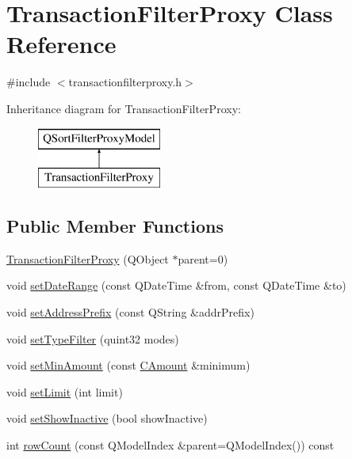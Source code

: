 \hypertarget{class_transaction_filter_proxy}{}\section{Transaction\+Filter\+Proxy Class Reference}
\label{class_transaction_filter_proxy}


{\ttfamily \#include $<$transactionfilterproxy.\+h$>$}

Inheritance diagram for Transaction\+Filter\+Proxy\+:\begin{figure}[H]
\begin{center}
\leavevmode
\includegraphics[height=2.000000cm]{class_transaction_filter_proxy}
\end{center}
\end{figure}
\subsection*{Public Member Functions}
\begin{DoxyCompactItemize}
\item 
\hyperlink{class_transaction_filter_proxy_a9981e03a2b60931e3e5adbe7e3fb6b7d}{Transaction\+Filter\+Proxy} (Q\+Object $\ast$parent=0)
\item 
void \hyperlink{class_transaction_filter_proxy_ad57cc552db9ce70bb4e8e1c12909992d}{set\+Date\+Range} (const Q\+Date\+Time \&from, const Q\+Date\+Time \&to)
\item 
void \hyperlink{class_transaction_filter_proxy_ad0b4258695ed1fbbf70d29f4e264361a}{set\+Address\+Prefix} (const Q\+String \&addr\+Prefix)
\item 
void \hyperlink{class_transaction_filter_proxy_af28eee58aee7585b71f057d044408106}{set\+Type\+Filter} (quint32 modes)
\item 
void \hyperlink{class_transaction_filter_proxy_a14688071f18551bf7d78225feb8ca8df}{set\+Min\+Amount} (const \hyperlink{amount_8h_a4eaf3a5239714d8c45b851527f7cb564}{C\+Amount} \&minimum)
\item 
void \hyperlink{class_transaction_filter_proxy_a3ec04a38573eb59b8f246f54658d2702}{set\+Limit} (int limit)
\item 
void \hyperlink{class_transaction_filter_proxy_aad1598cc4308eb08d8f617f08f62ece6}{set\+Show\+Inactive} (bool show\+Inactive)
\item 
int \hyperlink{class_transaction_filter_proxy_a606a2604ae4d991af677e6093701c8dc}{row\+Count} (const Q\+Model\+Index \&parent=Q\+Model\+Index()) const 
\end{DoxyCompactItemize}
